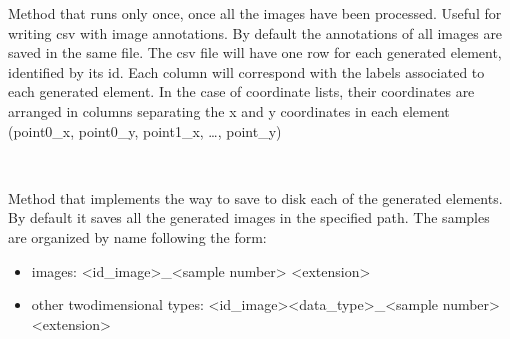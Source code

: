 \documentclass[letterpaper,10pt,english]{sphinxmanual}
\begin{document}
\begin{fulllineitems}
\begin{fulllineitems}
\begin{quote}
\end{quote}

Method that runs only once, once all the images have been processed. Useful for writing csv with image
annotations. By default the annotations of all images are saved in the same file. The csv file will have one
row for each generated element, identified by its id. Each column will correspond with the labels associated
to each generated element. In the case of coordinate lists, their coordinates are arranged in columns
separating the x and y coordinates in each element (point0\_x, point0\_y, point1\_x, …, point\_y)

\end{fulllineitems}


\begin{fulllineitems}
\label{\detokenize{ida_lib.image_augmentation:ida_lib.image_augmentation.augment_to_disk.AugmentToDisk.save_item}}~\begin{quote}

\end{quote}

Method that implements the way to save to disk each of the generated elements. By default it saves all the
generated images in the specified path. The samples are organized by name following the form:
\begin{itemize}
\item {} 
images:                       \textless{}id\_image\textgreater{}\_\textless{}sample number\textgreater{} \textless{}extension\textgreater{}

\item {} 
other two\sphinxhyphen{}dimensional types:  \textless{}id\_image\textgreater{}\sphinxhyphen{}\textless{}data\_type\textgreater{}\_\textless{}sample number\textgreater{} \textless{}extension\textgreater{}


\end{itemize}
\end{fulllineitems}
\end{fulllineitems}
\end{document}
